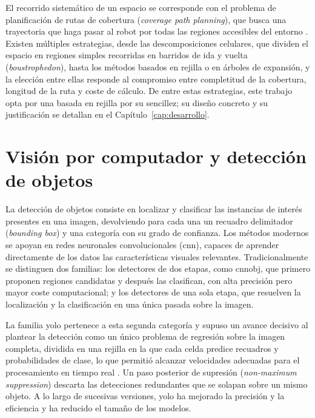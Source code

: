 El recorrido sistemático de un espacio se corresponde con el problema de
planificación de rutas de cobertura (\textit{coverage path planning}), que busca
una trayectoria que haga pasar al robot por todas las regiones accesibles del
entorno \parencite{galceran2013coverage}. Existen múltiples estrategias, desde las
descomposiciones celulares, que dividen el espacio en regiones simples recorridas
en barridos de ida y vuelta (\textit{boustrophedon}), hasta los métodos basados en
rejilla o en árboles de expansión, y la elección entre ellas responde al
compromiso entre completitud de la cobertura, longitud de la ruta y coste de
cálculo. De entre estas estrategias, este trabajo opta por una basada en rejilla por su
sencillez; su diseño concreto y su justificación se detallan en el
Capítulo~\ref{cap:desarrollo}.

\section{Visión por computador y detección de objetos}
\label{sec:vision}

La detección de objetos consiste en localizar y clasificar las instancias de
interés presentes en una imagen, devolviendo para cada una un recuadro
delimitador (\textit{bounding box}) y una categoría con su grado de confianza. Los
métodos modernos se apoyan en redes neuronales convolucionales (\acrshort{cnn}),
capaces de aprender directamente de los datos las características visuales
relevantes. Tradicionalmente se distinguen dos familias: los detectores de dos
etapas, como \gls{cnnobj}, que primero proponen regiones candidatas y después las
clasifican, con alta precisión pero mayor coste computacional; y los detectores de
una sola etapa, que resuelven la localización y la clasificación en una única
pasada sobre la imagen.

La familia \gls{yolo} pertenece a esta segunda categoría y supuso un avance
decisivo al plantear la detección como un único problema de regresión sobre la
imagen completa, dividida en una rejilla en la que cada celda predice recuadros y
probabilidades de clase, lo que permitió alcanzar velocidades adecuadas para el
procesamiento en tiempo real \parencite{redmon2016yolo}. Un paso posterior de
supresión (\textit{non-maximum suppression}) descarta las
detecciones redundantes que se solapan sobre un mismo objeto. A lo largo de
sucesivas versiones, \gls{yolo} ha mejorado la precisión y la eficiencia y ha
reducido el tamaño de los modelos.

